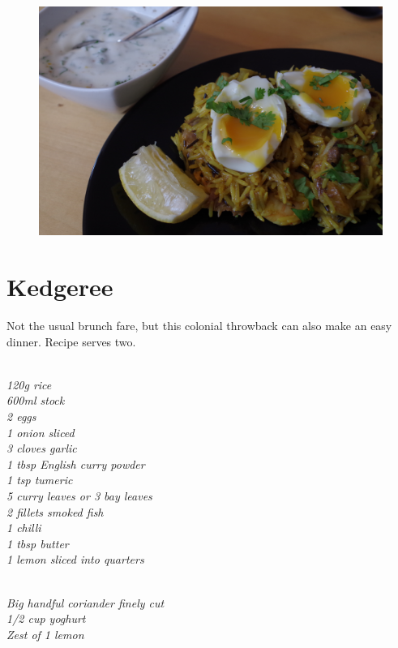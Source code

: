 \documentclass{tufte-book}
\begin{document}
\begin{figure}[h]
  \includegraphics[width=\linewidth]{kedgeree2.JPG}
\end{figure}

\section{Kedgeree}

Not the usual brunch fare, but this colonial throwback can also make an easy dinner. Recipe serves two.

\smallskip
{}
\\\emph{120g rice
\\600ml stock
\\2 eggs
\\1 onion sliced
\\3 cloves garlic
\\1 tbsp English curry powder
\\1 tsp tumeric
\\5 curry leaves or 3 bay leaves
\\2 fillets smoked fish
\\1 chilli
\\1 tbsp butter
\\1 lemon sliced into quarters
}

\newpage

\\\emph{Big handful coriander finely cut
\\1/2 cup yoghurt
\\Zest of 1 lemon
}
\end{document}
